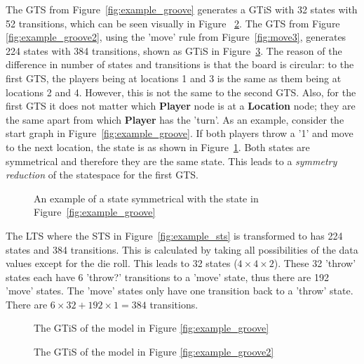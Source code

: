The GTS from Figure~\ref{fig:example_groove} generates a GTiS with 32 states with 52 transitions, which can be seen visually in Figure~ \ref{fig:statespace_groove1}. The GTS from Figure \ref{fig:example_groove2}, using the 'move' rule from Figure~\ref{fig:move3}, generates 224 states with 384 transitions, shown as GTiS in Figure~\ref{fig:statespace_groove2}. The reason of the difference in number of states and transitions is that the board is circular: to the first GTS, the players being at locations 1 and 3 is the same as them being at locations 2 and 4. However, this is not the same to the second GTS. Also, for the first GTS it does not matter which \textbf{Player} node is at a \textbf{Location} node; they are the same apart from which \textbf{Player} has the 'turn'. As an example, consider the start graph in Figure~\ref{fig:example_groove}. If both players throw a '1' and move to the next location, the state is as shown in Figure~\ref{fig:symmetry_example}. Both states are symmetrical and therefore they are the same state. This leads to a \textit{symmetry reduction} of the statespace for the first GTS.

\begin{figure}[h]
  \begin{center}
    
  \end{center}
  \caption{An example of a state symmetrical with the state in Figure~\ref{fig:example_groove}}
  \label{fig:symmetry_example}
\end{figure}

The LTS where the STS in Figure~\ref{fig:example_sts} is transformed to has 224 states and 384 transitions. This is calculated by taking all possibilities of the data values except for the die roll. This leads to 32 states ($4 \times 4 \times 2$). These 32 'throw' states each have 6 'throw?' transitions to a 'move' state, thus there are 192 'move' states. The 'move' states only have one transition back to a 'throw' state. There are $6 \times 32 + 192 \times 1 = 384$ transitions.

\begin{figure}[h]
  \begin{center}
    \resizebox{\textwidth}{!}{}
  \end{center}
  \caption{The GTiS of the model in Figure \ref{fig:example_groove}}
  \label{fig:statespace_groove1}
\end{figure}

\begin{figure}[h!]
  \begin{center}
    \resizebox{\textwidth}{!}{}
  \end{center}
  \caption{The GTiS of the model in Figure \ref{fig:example_groove2}}
  \label{fig:statespace_groove2}
\end{figure}
